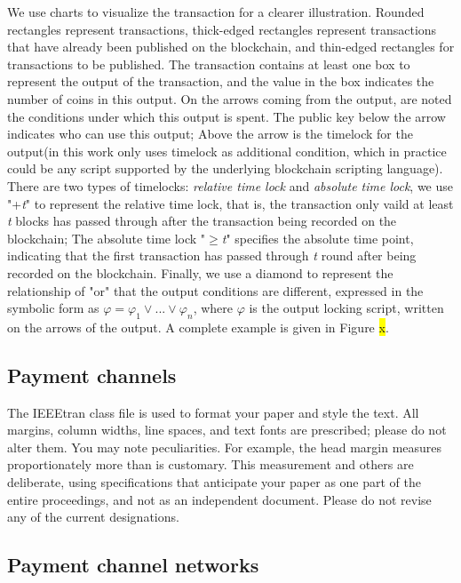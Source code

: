 \documentclass[conference]{IEEEtran}
\begin{document}
 We use charts to visualize the transaction for a clearer illustration. Rounded rectangles represent transactions, thick-edged rectangles 
 represent transactions that have already been published on the blockchain, and thin-edged rectangles for transactions to be published.
 The transaction contains at least one box to represent the output of the transaction, and the value in the box indicates the number of 
 coins in this output. On the arrows coming from the output, are noted the conditions under which this output is spent. The public key 
 below the arrow indicates who can use this output; Above the arrow is the timelock for the output(in this work only uses timelock 
 as additional condition, which in practice could be any script supported by the underlying blockchain scripting language). There are 
 two types of timelocks: \emph{relative time lock} and \emph{absolute time lock}, we use "+\emph{t}" to represent the relative time lock, 
 that is, the transaction only vaild at least \emph{t} blocks has passed through after the transaction being recorded on the blockchain; 
 The absolute time lock "$\geq$\emph{t}" specifies the absolute time point, indicating that the first transaction has passed through \emph{t} 
 round after being recorded on the blockchain. Finally, we use a diamond to represent the relationship of "or" that the output conditions are 
 different, expressed in the symbolic form as $\varphi = \varphi_1 \vee ...\vee \varphi_n$, where $\varphi$ is the output locking script,
 written on the arrows of the output. A complete example is given in Figure \colorbox{yellow}{x}.




\subsection{Payment channels}

The IEEEtran class file is used to format your paper and style the text. All margins, 
column widths, line spaces, and text fonts are prescribed; please do not 
alter them. You may note peculiarities. For example, the head margin
measures proportionately more than is customary. This measurement 
and others are deliberate, using specifications that anticipate your paper 
as one part of the entire proceedings, and not as an independent document. 
Please do not revise any of the current designations.

\subsection{Payment channel networks}
\end{document}
